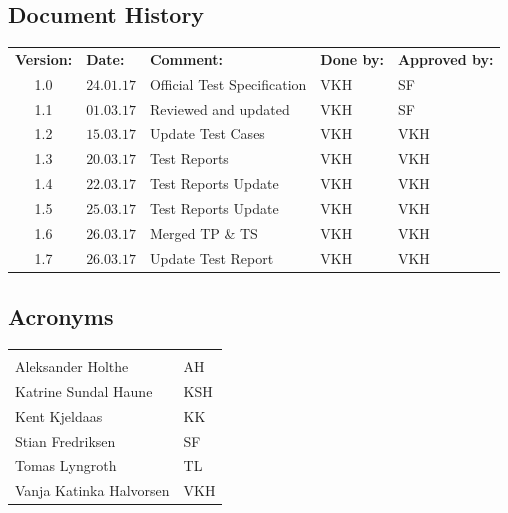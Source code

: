 \documentclass{article}
\begin{document}
\begin{center}
\section*{\textbf{Document History}}
\begin{tabular}{cllll}
\rowcolor{cadetgrey}
\textbf{Version:}    &\textbf{Date:} 	 &\textbf{Comment:}    &\textbf{Done by:}   &\textbf{Approved by:}  \\
1.0     & $24.01.17$    & Official Test Specification & VKH & SF \\
\rowcolor{gainsboro}1.1     & $01.03.17$    & Reviewed and updated & VKH & SF \\
1.2     & $15.03.17$    & Update Test Cases & VKH & VKH \\
\rowcolor{gainsboro}1.3     & $20.03.17$    & Test Reports & VKH & VKH \\
1.4     & $22.03.17$    & Test Reports Update & VKH & VKH \\
\rowcolor{gainsboro}1.5     & $25.03.17$    & Test Reports Update & VKH & VKH \\
1.6     & $26.03.17$    & Merged TP \& TS & VKH & VKH \\
\rowcolor{gainsboro}1.7     & $26.03.17$    & Update Test Report & VKH & VKH \\
\end{tabular}                                                                   
\end{center}
\vspace*{0.5 cm}

\begin{center}
\section*{\textbf{Acronyms}}
\begin{tabular}{ll}
\rowcolor{cadetgrey}
    &   \\
Aleksander Holthe      & AH     
 \\\rowcolor{gainsboro}
Katrine Sundal Haune  & KSH \\
Kent Kjeldaas         & KK 
 \\\rowcolor{gainsboro}
Stian Fredriksen      & SF  \\
Tomas Lyngroth       & TL   
 \\\rowcolor{gainsboro}
Vanja Katinka Halvorsen     & VKH   \\
\end{tabular}                                                             
\end{center}
\end{document}
